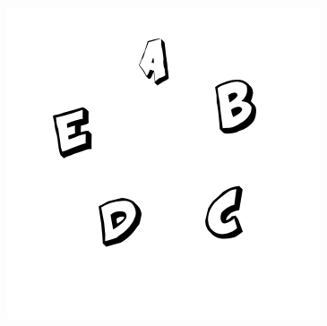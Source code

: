 \begin{frame}
\begin{textblock}{10}
{\begin{center}
\includegraphics[scale=0.5]{image/cy2.pdf}\\
{\em \underline{}}
\end{center}
}%
\end{textblock}
\end{frame}

